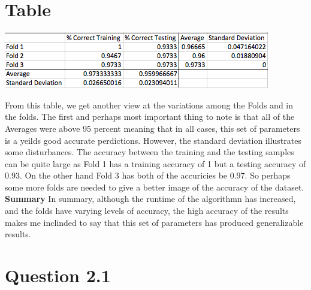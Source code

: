 \documentclass[epsfig]{article}
\begin{document}
\section*{Table}
\begin{center}
\includegraphics[scale=1]{pic7}
\end{center}
From this table, we get another view at the variations among the Folds and in the folds. The first and perhaps most important thing to note is that all of the Averages were above 95 percent meaning that in all cases, this set of parameters is a yeilds good accurate perdictions. However, the standard deviation illustrates some disturbances. The accuracy between the training and the testing samples can be quite large as Fold 1 has a training accuracy of 1 but a testing accuracy of 0.93. On the other hand Fold 3 has both of the accuricies be 0.97. So perhaps some more folds are needed to give a better image of the accuracy of the dataset. \\
\newline
\textbf{Summary}
In summary, although the runtime of the algorithmn has increased, and the folds have varying levels of accuracy, the high accuracy of the results makes me inclinded to say that this set of parameters has produced generalizable results.
\newpage
\section*{Question 2.1}
\end{document}
